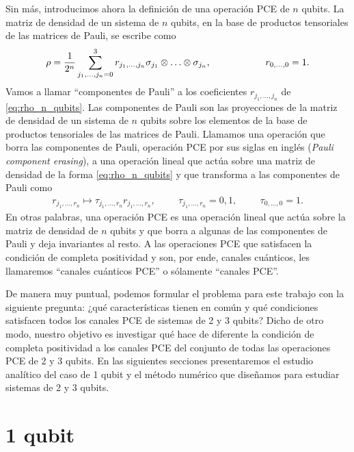 Sin más, introducimos ahora la definición de una operación PCE de 
$n$ qubits. La matriz de densidad de un sistema de $n$ qubits, en la base de
productos tensoriales de las matrices de Pauli, se escribe como
\begin{align}\label{eq:rho_n_qubits}
\rho=\frac{1}{2^n}\sum_{j_1,\ldots,j_n=0}^3
r_{j_1,\ldots,j_n}\sigma_{j_1}\otimes\ldots\otimes\sigma_{j_n},
\hspace{2cm} r_{0,\ldots,0}=1.
\end{align}
Vamos a llamar ``componentes de Pauli'' a los coeficientes $r_{j_1,\ldots,j_n}$
de \eqref{eq:rho_n_qubits}. Las componentes de Pauli son las proyecciones
de la matriz de densidad de un sistema de $n$ qubits sobre los elementos
de la base de productos tensoriales de las matrices de Pauli.
Llamamos una operación que borra las componentes de Pauli, 
operación PCE por sus siglas en inglés (\textit{Pauli
component erasing}), a una operación lineal que actúa sobre una 
matriz de densidad de la forma \eqref{eq:rho_n_qubits} y 
que transforma a las componentes de Pauli como
\begin{align}\label{eq:PCE_definition}
r_{j_1,\ldots,r_n}\longmapsto \tau_{j_1,\ldots,r_n}r_{j_1,\ldots,r_n},
\hspace{1cm} \tau_{j_1,\ldots,r_n} = 0,1,
\hspace{1cm} \tau_{0,\ldots,0}=1.
\end{align}
En otras palabras, una operación PCE es una operación lineal que actúa sobre la
matriz de densidad de $n$ qubits y que borra a algunas de las componentes de
Pauli y deja invariantes al resto.
A las operaciones PCE que satisfacen 
la condición de completa positividad y son, por ende, canales cuánticos,
les llamaremos ``canales cuánticos PCE'' o sólamente ``canales PCE''.

De manera muy puntual, podemos formular el problema para 
este trabajo con la siguiente pregunta: ¿qué características tienen 
en común y qué condiciones satisfacen todos los canales PCE 
de sistemas de 2 y 3 qubits? Dicho de otro modo, 
nuestro objetivo es investigar qué hace de diferente la condición de 
completa positividad a los canales PCE del conjunto de todas las 
operaciones PCE de 2 y 3 qubits.
En las siguientes secciones presentaremos el estudio analítico del 
caso de 1 qubit y el método numérico que diseñamos 
para estudiar sistemas de 2 y 3 qubits. 


\section{1 qubit} %
\label{sec:1_qubit_problem}
%

